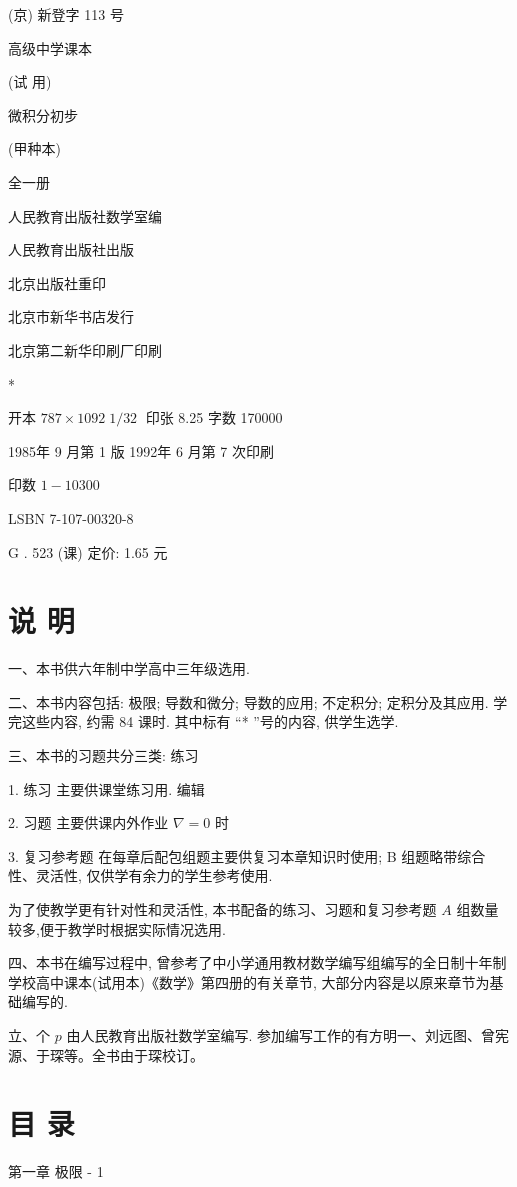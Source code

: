 \documentclass[10pt]{article}
\begin{document}
(京) 新登字 113 号

高级中学课本

(试 用)

微积分初步

(甲种本)

全一册

人民教育出版社数学室编

人民教育出版社出版

北京出版社重印

北京市新华书店发行

北京第二新华印刷厂印刷

*

开本 \({787} \times {1092}\;1/{32}\;\) 印张 8.25 字数 170000

1985年 9 月第 1 版 1992年 6 月第 7 次印刷

印数 \(1 - {10300}\)

LSBN 7-107-00320-8

G . 523 (课) 定价: 1.65 元

\section*{说 明}

一、本书供六年制中学高中三年级选用.

二、本书内容包括: 极限; 导数和微分; 导数的应用; 不定积分; 定积分及其应用. 学完这些内容, 约需 84 课时. 其中标有 “* ”号的内容, 供学生选学.

三、本书的习题共分三类: 练习

1. 练习 主要供课堂练习用. 编辑

2. 习题 主要供课内外作业 \(\nabla = 0\) 时

3. 复习参考题 在每章后配包组题主要供复习本章知识时使用; B 组题略带综合性、灵活性, 仅供学有余力的学生参考使用.

为了使教学更有针对性和灵活性, 本书配备的练习、习题和复习参考题 \(A\) 组数量较多,便于教学时根据实际情况选用.

四、本书在编写过程中, 曾参考了中小学通用教材数学编写组编写的全日制十年制学校高中课本(试用本)《数学》第四册的有关章节, 大部分内容是以原来章节为基础编写的.

立、个 \(p\) 由人民教育出版社数学室编写. 参加编写工作的有方明一、刘远图、曾宪源、于琛等。全书由于琛校订。

\section*{目 录}

第一章 极限 - 1
\end{document}
